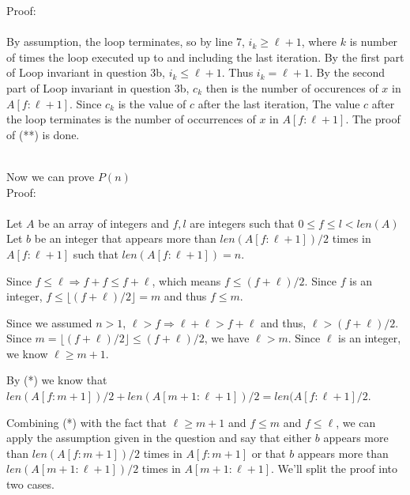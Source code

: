 \documentclass{article}
\begin{document}
\begin{enumerate}
\begin{enumerate}
\begin{enumerate}
\begin{enumerate}
	Proof:\\\\
	By assumption, the loop terminates, so by line 7, $i_k \geq \ell + 1$, where $k$ is number of times the loop executed up to and including the last iteration. By the first part of Loop invariant in question 3b, $i_k \leq \ell + 1$.
	Thus $i_k = \ell + 1$. By the second part of Loop invariant in question 3b, $c_k$ then is the number of occurences of $x$ in $A[f:\ell + 1]$. Since $c_k$ is the value of $c$ after the last iteration, The value $c$ after the loop terminates is the number of occurrences of $x$ in $A[f:\ell +1]$. The proof of (**) is done.\\\\
\end{enumerate}

Now we can prove $P(n)$\\
Proof:\\\\
Let $A$ be an array of integers and $f, l$ are integers such that $0\le f \le l < len(A)$\\
Let $b$ be an integer that appears more than $len(A[f:\ell+1])/2$ times in $A[f:\ell +1]$ such that $len(A[f:\ell +1]) = n$. 

Since $f \leq \ell \Rightarrow f + f \leq  f + \ell$, which means $f \leq (f+\ell)/2$.
Since $f$ is an integer, $f \leq  \lfloor(f+\ell)/2\rfloor = m$ and thus $f \leq m$.

Since we assumed $n >1$, $\ell > f \Rightarrow \ell + \ell > f + \ell$ and thus, $\ell >  (f + \ell)/2$. Since $m =  \lfloor(f+\ell)/2\rfloor \leq  (f+\ell)/2$, we have $\ell > m$. Since $\ell$ is an integer, we know $\ell \geq m + 1$.



By (*) we know that $len(A[f:m+1])/2 + len(A[m+1:\ell + 1])/2 = len(A[f:\ell + 1]/2$. 

Combining (*) with the fact that  $\ell \geq m + 1$ and $f \leq m$ and $f \leq \ell$, we can apply the assumption given in the question and say that either $b$ appears more than $len(A[f:m+1])/2$ times in $A[f:m+1]$ or that $b$ appears more than $len(A[m+1:\ell + 1])/2$ times in $A[m+1:\ell + 1]$. We'll split the proof into two cases.


\end{enumerate}
\end{enumerate}
\end{enumerate}
\end{document}
